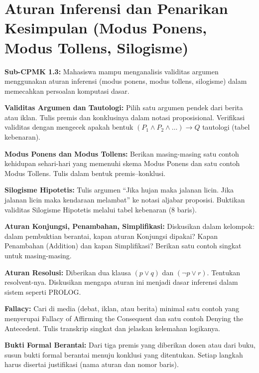 \documentclass[../main]{subfiles}
\begin{document}
\chapter{Aturan Inferensi dan Penarikan Kesimpulan (Modus Ponens, Modus Tollens, Silogisme)}

\begin{subcpmk}
  \item \textbf{Sub-CPMK 1.3:} Mahasiswa mampu menganalisis validitas argumen menggunakan aturan inferensi (modus ponens, modus tollens, silogisme) dalam memecahkan persoalan komputasi dasar.
\end{subcpmk}










\begin{aktivitas}
  \item \textbf{Validitas Argumen dan Tautologi:} Pilih satu argumen pendek dari berita atau iklan. Tulis premis dan konklusinya dalam notasi proposisional. Verifikasi validitas dengan mengecek apakah bentuk $(P_1 \wedge P_2 \wedge \ldots) \rightarrow Q$ tautologi (tabel kebenaran).
  \item \textbf{Modus Ponens dan Modus Tollens:} Berikan masing-masing satu contoh kehidupan sehari-hari yang memenuhi skema Modus Ponens dan satu contoh Modus Tollens. Tulis dalam bentuk premis–konklusi.
  \item \textbf{Silogisme Hipotetis:} Tulis argumen ``Jika hujan maka jalanan licin. Jika jalanan licin maka kendaraan melambat'' ke notasi aljabar proposisi. Buktikan validitas Silogisme Hipotetis melalui tabel kebenaran (8 baris).
  \item \textbf{Aturan Konjungsi, Penambahan, Simplifikasi:} Diskusikan dalam kelompok: dalam pembuktian berantai, kapan aturan Konjungsi dipakai? Kapan Penambahan (Addition) dan kapan Simplifikasi? Berikan satu contoh singkat untuk masing-masing.
  \item \textbf{Aturan Resolusi:} Diberikan dua klausa $(p \vee q)$ dan $(\neg p \vee r)$. Tentukan resolvent-nya. Diskusikan mengapa aturan ini menjadi dasar inferensi dalam sistem seperti PROLOG.
  \item \textbf{Fallacy:} Cari di media (debat, iklan, atau berita) minimal satu contoh yang menyerupai Fallacy of Affirming the Consequent dan satu contoh Denying the Antecedent. Tulis transkrip singkat dan jelaskan kelemahan logikanya.
  \item \textbf{Bukti Formal Berantai:} Dari tiga premis yang diberikan dosen atau dari buku, susun bukti formal berantai menuju konklusi yang ditentukan. Setiap langkah harus disertai justifikasi (nama aturan dan nomor baris).
\end{aktivitas}
\end{document}
